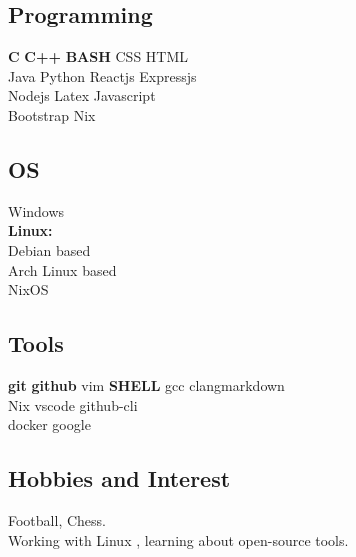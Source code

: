 \documentclass[]{deedy-resume-openfont}
\begin{document}
\begin{minipage}[t]{0.32\textwidth}
\subsection{Programming}
\textbullet{}\textbf{C} \textbullet{} \textbf{C++} \textbullet{} \textbf{BASH} \textbullet{} CSS \textbullet{} HTML \\
\textbullet{} Java \textbullet{} Python \textbullet{} Reactjs \textbullet{} Expressjs\\
\textbullet{} Nodejs \textbullet{} Latex \textbullet{} Javascript\\ \textbullet{} Bootstrap \textbullet{} Nix
\sectionsep

\subsection{OS}
Windows \\
\textbf{Linux:} \\
\textbullet{} Debian based \\
\textbullet{} Arch Linux based \\
\textbullet{} NixOS
\sectionsep

\subsection{Tools}
\textbullet{}\textbf{git} \textbullet{} \textbf{github} \textbullet{} vim \textbullet{} \textbf{SHELL} \textbullet{} gcc \textbullet{}clang\textbullet{}markdown\\
\textbullet{} Nix \textbullet{} vscode \textbullet{} github-cli \\
\textbullet{} docker \textbullet{}google
\sectionsep

\subsection{Hobbies and Interest}
\textbullet{}Football, Chess.\\
\textbullet{}Working with Linux , learning about open-source tools.
\sectionsep

%
%

\end{minipage} 
\hfill
\end{document}
